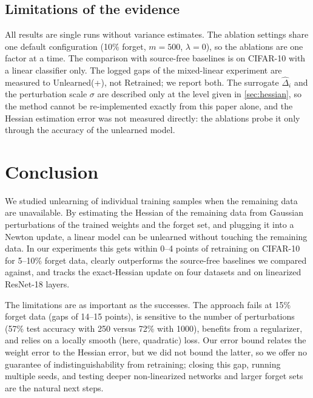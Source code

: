 \documentclass[10pt,twocolumn,letterpaper]{article}
\begin{document}


\subsection{Limitations of the evidence}
All results are single runs without variance estimates.
The ablation settings share one default configuration (10\% forget, $m=500$, $\lambda=0$), so the ablations are one factor at a time.
The comparison with source-free baselines is on CIFAR-10 with a linear classifier only.
The logged gaps of the mixed-linear experiment are measured to Unlearned(+), not Retrained; we report both.
The surrogate $\hat\Delta_i$ and the perturbation scale $\sigma$ are described only at the level given in \cref{sec:hessian}, so the method cannot be re-implemented exactly from this paper alone, and the Hessian estimation error was not measured directly: the ablations probe it only through the accuracy of the unlearned model.

\section{Conclusion}
\label{sec:conclusion}
We studied unlearning of individual training samples when the remaining data are unavailable.
By estimating the Hessian of the remaining data from Gaussian perturbations of the trained weights and the forget set, and plugging it into a Newton update, a linear model can be unlearned without touching the remaining data.
In our experiments this gets within 0--4 points of retraining on CIFAR-10 for 5--10\% forget data, clearly outperforms the source-free baselines we compared against, and tracks the exact-Hessian update on four datasets and on linearized ResNet-18 layers.

The limitations are as important as the successes.
The approach fails at 15\% forget data (gaps of 14--15 points), is sensitive to the number of perturbations (57\% test accuracy with 250 versus 72\% with 1000), benefits from a regularizer, and relies on a locally smooth (here, quadratic) loss.
Our error bound relates the weight error to the Hessian error, but we did not bound the latter, so we offer no guarantee of indistinguishability from retraining; closing this gap, running multiple seeds, and testing deeper non-linearized networks and larger forget sets are the natural next steps.

{
    \small
    
    
}

\end{document}

